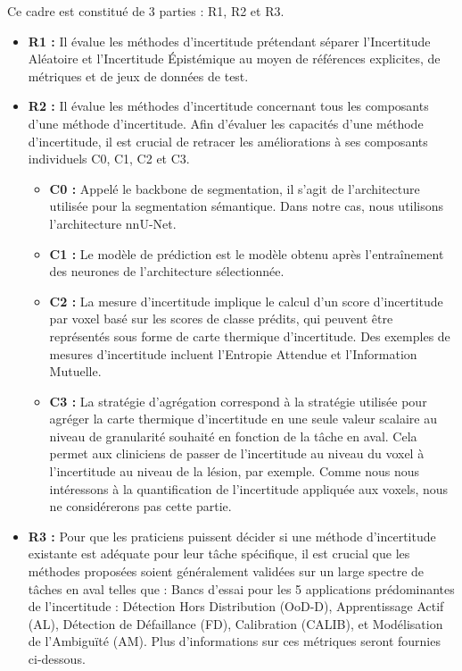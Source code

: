 \documentclass[a4paper,french,bookmarks,12pt]{article}
\begin{document}
Ce cadre est constitué de 3 parties : R1, R2 et R3.

\begin{itemize}
    \item \textbf{R1 :} Il évalue les méthodes d'incertitude prétendant séparer l'Incertitude Aléatoire et l'Incertitude Épistémique au moyen de références explicites, de métriques et de jeux de données de test.
    \item \textbf{R2 :} Il évalue les méthodes d'incertitude concernant tous les composants d'une méthode d'incertitude. Afin d'évaluer les capacités d'une méthode d'incertitude, il est crucial de retracer les améliorations à ses composants individuels C0, C1, C2 et C3.
    \begin{itemize}
        \item \textbf{C0 :} Appelé le backbone de segmentation, il s'agit de l'architecture utilisée pour la segmentation sémantique. Dans notre cas, nous utilisons l'architecture nnU-Net.
        \item \textbf{C1 :} Le modèle de prédiction est le modèle obtenu après l'entraînement des neurones de l'architecture sélectionnée.
        \item \textbf{C2 :} La mesure d'incertitude implique le calcul d'un score d'incertitude par voxel basé sur les scores de classe prédits, qui peuvent être représentés sous forme de carte thermique d'incertitude. Des exemples de mesures d'incertitude incluent l'Entropie Attendue et l'Information Mutuelle.
        \item \textbf{C3 :} La stratégie d'agrégation correspond à la stratégie utilisée pour agréger la carte thermique d'incertitude en une seule valeur scalaire au niveau de granularité souhaité en fonction de la tâche en aval. Cela permet aux cliniciens de passer de l'incertitude au niveau du voxel à l'incertitude au niveau de la lésion, par exemple. Comme nous nous intéressons à la quantification de l'incertitude appliquée aux voxels, nous ne considérerons pas cette partie.
    \end{itemize}
    \item \textbf{R3 :} Pour que les praticiens puissent décider si une méthode d'incertitude existante est adéquate pour leur tâche spécifique, il est crucial que les méthodes proposées soient généralement validées sur un large spectre de tâches en aval telles que : Bancs d'essai pour les 5 applications prédominantes de l'incertitude : Détection Hors Distribution (OoD-D), Apprentissage Actif (AL), Détection de Défaillance (FD), Calibration (CALIB), et Modélisation de l'Ambiguïté (AM). Plus d'informations sur ces métriques seront fournies ci-dessous.
\end{itemize}
\end{document}

